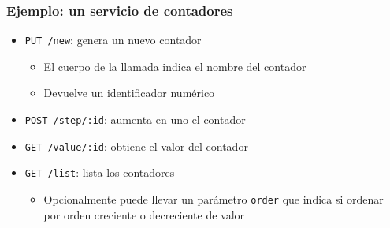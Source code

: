 \documentclass{beamer}
\begin{document}
\begin{frame}[fragile]
\frametitle{Ejemplo: un servicio de contadores}
\begin{itemize}
\item {\tt PUT /new}: genera un nuevo contador
\begin{itemize}
\item El cuerpo de la llamada indica el nombre del contador
\item Devuelve un identificador numérico
\end{itemize}
\item {\tt POST /step/:id}: aumenta en uno el contador
\item {\tt GET /value/:id}: obtiene el valor del contador
\item {\tt GET /list}: lista los contadores
\begin{itemize}
\item Opcionalmente puede llevar un parámetro {\tt order} que indica si ordenar por orden creciente o decreciente de valor
\end{itemize}
\end{itemize}
\end{frame}
\end{document}
